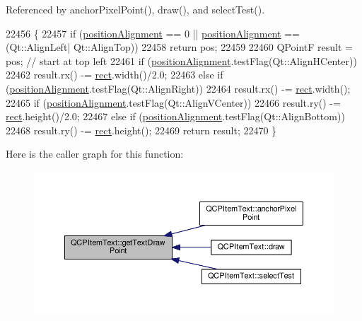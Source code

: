 Referenced by anchor\+Pixel\+Point(), draw(), and select\+Test().


\begin{DoxyCode}
22456 \{
22457   \textcolor{keywordflow}{if} (\hyperlink{class_q_c_p_item_text_af13c6adc480f268116ae72196eb44b06}{positionAlignment} == 0 || \hyperlink{class_q_c_p_item_text_af13c6adc480f268116ae72196eb44b06}{positionAlignment} == (Qt::AlignLeft|
      Qt::AlignTop))
22458     \textcolor{keywordflow}{return} pos;
22459   
22460   QPointF result = pos; \textcolor{comment}{// start at top left}
22461   \textcolor{keywordflow}{if} (\hyperlink{class_q_c_p_item_text_af13c6adc480f268116ae72196eb44b06}{positionAlignment}.testFlag(Qt::AlignHCenter))
22462     result.rx() -= \hyperlink{_gen_blob_8m_aea8f6815d9a63491fc422c5572c6b3c3}{rect}.width()/2.0;
22463   \textcolor{keywordflow}{else} \textcolor{keywordflow}{if} (\hyperlink{class_q_c_p_item_text_af13c6adc480f268116ae72196eb44b06}{positionAlignment}.testFlag(Qt::AlignRight))
22464     result.rx() -= \hyperlink{_gen_blob_8m_aea8f6815d9a63491fc422c5572c6b3c3}{rect}.width();
22465   \textcolor{keywordflow}{if} (\hyperlink{class_q_c_p_item_text_af13c6adc480f268116ae72196eb44b06}{positionAlignment}.testFlag(Qt::AlignVCenter))
22466     result.ry() -= \hyperlink{_gen_blob_8m_aea8f6815d9a63491fc422c5572c6b3c3}{rect}.height()/2.0;
22467   \textcolor{keywordflow}{else} \textcolor{keywordflow}{if} (\hyperlink{class_q_c_p_item_text_af13c6adc480f268116ae72196eb44b06}{positionAlignment}.testFlag(Qt::AlignBottom))
22468     result.ry() -= \hyperlink{_gen_blob_8m_aea8f6815d9a63491fc422c5572c6b3c3}{rect}.height();
22469   \textcolor{keywordflow}{return} result;
22470 \}
\end{DoxyCode}


Here is the caller graph for this function\+:\nopagebreak
\begin{figure}[H]
\begin{center}
\leavevmode
\includegraphics[width=350pt]{class_q_c_p_item_text_aa6e478b1ce198eace89157c4cacc3ddc_icgraph}
\end{center}
\end{figure}


